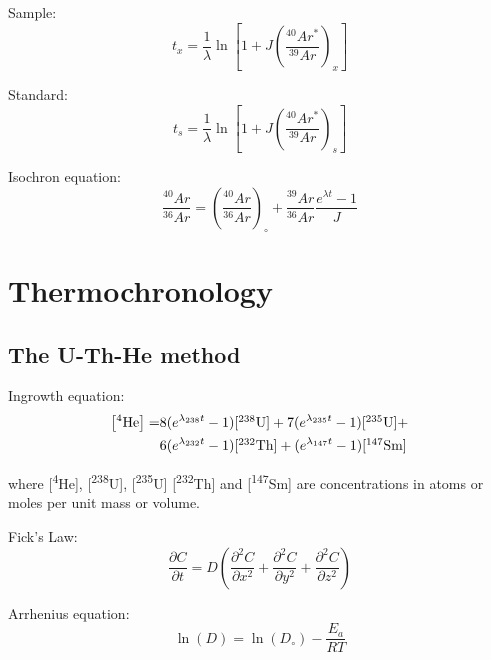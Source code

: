 \documentclass{article}
\begin{document}
\begin{multicols}{3}
Sample:
\begin{equation}
t_x = \frac{1}{\lambda} \ln\left[
1 + J \left(\frac{^{40}Ar^*}{^{39}Ar}\right)_x 
\right]
\label{eq:Ar-Ar}
\end{equation}

Standard:
\begin{equation}
t_s = \frac{1}{\lambda} \ln\left[
1 + J \left(\frac{^{40}Ar^*}{^{39}Ar}\right)_s 
\right]
\label{eq:J}
\end{equation}

Isochron equation:
\begin{equation}
\frac{{}^{40}Ar}{{}^{36}Ar} =
\left(\frac{{}^{40}Ar}{{}^{36}Ar}\right)_\circ +
\frac{{}^{39}Ar}{{}^{36}Ar}\frac{e^{\lambda t} - 1}{J}
\label{eq:Ar-Ar-isochron}
\end{equation}

\section{Thermochronology}

\subsection{The U-Th-He method}
\label{sec:U-Th-He}

Ingrowth equation:
\begin{equation}
\begin{split}
  \left[^4\mbox{He}\right] = &
  8 (e^{\lambda_{238}t} - 1) \mbox{[\textsuperscript{238}U]} + 
  7 (e^{\lambda_{235}t} - 1) \mbox{[\textsuperscript{235}U]} + \\
  ~ & 6 (e^{\lambda_{232}t} - 1) \mbox{[\textsuperscript{232}Th]} +
  (e^{\lambda_{147}t} - 1) \mbox{[\textsuperscript{147}Sm]}
\end{split}
\label{eq:U-Th-He}
\end{equation}

where [\textsuperscript{4}He], [\textsuperscript{238}U],
[\textsuperscript{235}U] [\textsuperscript{232}Th] and
[\textsuperscript{147}Sm] are concentrations in atoms or moles per
unit mass or volume.

Fick's Law:
\begin{equation}
\frac{\partial C}{\partial t} = D \left(
\frac{\partial^2C}{\partial x^2} + \frac{\partial^2C}{\partial y^2} +
\frac{\partial^2C}{\partial z^2}\right)
\label{eq:fick}
\end{equation}

Arrhenius equation:
\begin{equation}
\ln(D) = \ln(D_\circ) - \frac{E_a}{RT}
\label{eq:logD}
\end{equation}


\end{multicols}
\end{document}
